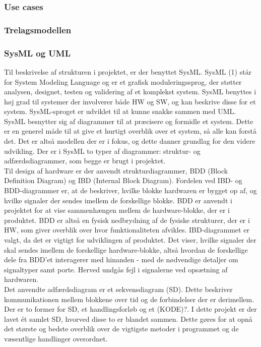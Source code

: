 \subsubsection{Use cases}
\subsubsection{Trelagsmodellen}
\subsubsection{SysML og UML}

Til beskrivelse af strukturen i projektet, er der benyttet SysML. 
SysML (1) står for System Modeling Language og er et grafisk moduleringssprog, der støtter analysen, designet, testen og validering af et komplekst system. SysML benyttes i høj grad til systemer der involverer både HW og SW, og kan beskrive disse for et system. SysML-sproget er udviklet til at kunne snakke sammen med UML. 
SysML besnytter sig af diagrammer til at præcisere og formidle et system. Dette er en generel måde til at give et hurtigt overblik over et system, så alle kan forstå det. Det er altså modellen der er i fokus, og dette danner grundlag for den videre udvikling. Der er i SysML to typer af diagrammer: struktur- og adfærdsdiagrammer, som begge er brugt i projektet.\\
\newline
Til design af hardware er der anvendt strukturdiagrammer, BDD (Block Definition Diagram) og IBD (Internal Block Diagram). Fordelen ved IBD- og BDD-diagrammer er, at de beskriver, hvilke blokke hardwaren er bygget op af, og hvilke signaler der sendes imellem de forskellige blokke. BDD er anvendt i projektet for at vise sammenhængen mellem de hardware-blokke, der er i produktet. BDD er altså en fysisk nedbrydning af de fysiske strukturer, der er i HW, som giver overblik over hvor funktionaliteten afvikles. IBD-diagrammet er valgt, da det er vigtigt for udviklingen af produktet. Det viser, hvilke signaler der skal sendes imellem de forskellige hardware-blokke, altså hvordan de forskellige dele fra BDD'et interagerer med hinanden - med de nødvendige detaljer om signaltyper samt porte. Herved undgås fejl i signalerne ved opsætning af hardwaren.\\
\newline
Det anvendte adfærdsdiagram er et sekvensdiagram (SD). Dette beskriver kommunikationen mellem blokkene over tid og de forbindelser der er derimellem. Der er to former for SD, et handlingsforløb og et (KODE)?. I dette projekt er der lavet ét samlet SD, hvorved disse to er blandet sammen. Dette gøres for at opnå det største og bedste overblik over de vigtigste metoder i programmet og de væsentlige handlinger overordnet. \\
